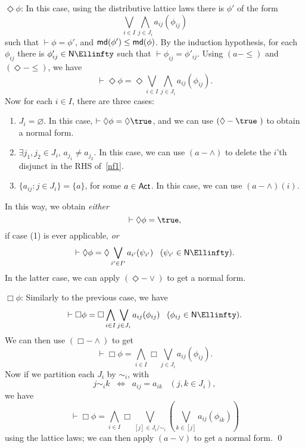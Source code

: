 \noindent $\Diamond \phi$: In this case, using the distributive lattice laws there is $\phi'$ of the form
\[ \bigvee_{i \in I} \bigwedge_{j \in J_{i}} a_{ij}(\phi_{ij}) \]
such that $\vdash  \phi = \phi'$, and ${\sf md}(\phi' ) \leq {\sf md}(\phi)$.
By the induction hypothesis, for each $\phi_{ij}$ there is $\phi'_{ij} \in {\sf N} \Ellinfty$ such that $\vdash  \phi_{ij} = \phi'_{ij}$.
Using $(a-{\leq})$ and $({\Diamond}-{\leq})$, we have
\begin{equation} 
\label{nf1}
\vdash  \Diamond \phi = \Diamond \bigvee_{i \in I} \bigwedge_{j \in J_{i}} a_{ij}(\phi_{ij}) .
\end{equation}
Now for each $i \in I$, there are three cases:
\begin{enumerate}
\item $J_{i} = \varnothing$. In this case, $\vdash \Diamond \phi = \Diamond \true$, and we can use $({\Diamond}-\true\ )$ to obtain a normal form.
\item $\exists j_{1}, j_{2} \in J_{i}$, $a_{j_{1}} \not= a_{j_{2}}$.
In this case, we can use $(a-{\wedge})$ to delete the $i$'th disjunct in the RHS of~\ref{nf1}.
\item $\{ a_{ij} : j \in J_{i} \} = \{ a \}$, for some $a \in {\sf Act}$. In this case, we can use $(a-{\wedge})(i)$.
\end{enumerate}
In this way, we obtain {\em either}
\[ \vdash \Diamond \phi = \true , \]
if case (1) is ever applicable, {\em or}
\[ \vdash \Diamond \phi = \Diamond \bigvee_{i' \in I'} a_{i'}(\psi_{i'}) \;\;\; (\psi_{i'} \in {\sf N} \Ellinfty ). \]
In the latter case, we can apply $({\Diamond}-{\vee})$ to get a normal form.

\noindent $\Box \phi$: Similarly to the previous case, we have
\[ \vdash \Box \phi = \Box \bigwedge_{i \in I} \bigvee_{j \in J_{i}} a_{ij} (\phi_{ij}) \;\;\; (\phi_{ij} \in {\sf N} \Ellinfty ). \]
We can then use $({\Box}-{\wedge})$ to get
\[ \vdash \Box \phi =  \bigwedge_{i \in I} \Box \bigvee_{j \in J_{i}} a_{ij} (\phi_{ij}) . \]
Now if we partition each $J_{i}$ by $\sim_{i}$, with
\[ j \sim_{i} k \;\; \Longleftrightarrow \;\; a_{ij} = a_{ik} \;\;\; (j, k \in J_{i}),  \]
we have
\[ \vdash \Box \phi =  \bigwedge_{i \in I} \Box \bigvee_{[j] \in J_{i}/{\sim_{i}}} ( \bigvee_{k \in [j]} a_{ij} (\phi_{ik}))  \]
using the lattice laws; we can then apply $(a-{\vee})$ to get a normal form. \qed

